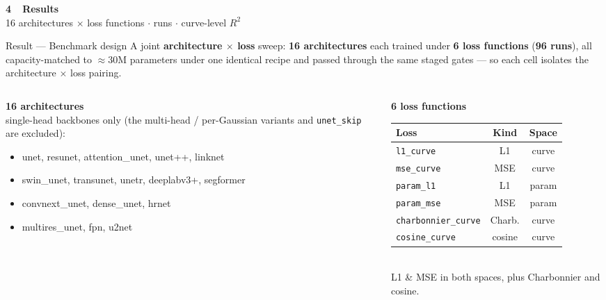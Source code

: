 \documentclass[aspectratio=169,10pt]{beamer}
\begin{document}
\begin{frame}[plain]
  \centering \vfill
  {\Large\bfseries\color{accent} 4\ \ Results}\\[4pt]
  {\small 16 architectures \; $\times$  loss functions \; $\cdot$  runs \; $\cdot$ \; curve-level $R^2$}
  \vfill
\end{frame}

\begin{frame}{Result --- Benchmark design}
  \small
  A joint \textbf{architecture $\times$ loss} sweep: \textbf{16 architectures} each trained
  under \textbf{6 loss functions} (\textbf{96 runs}), all capacity-matched to $\approx\!30$M
  parameters under one identical recipe and passed through the same staged gates --- so each
  cell isolates the architecture $\times$ loss pairing.
  \begin{columns}[T]
    \begin{column}{0.55\textwidth}
      \textbf{\scriptsize 16 architectures}\\[1pt]
      {\scriptsize single-head backbones only (the multi-head / per-Gaussian variants and
      \texttt{unet\_skip} are excluded):}
      \begin{itemize}\scriptsize
        \item unet, resunet, attention\_unet, unet++, linknet
        \item swin\_unet, transunet, unetr, deeplabv3+, segformer
        \item convnext\_unet, dense\_unet, hrnet
        \item multires\_unet, fpn, u2net
      \end{itemize}
    \end{column}
    \begin{column}{0.45\textwidth}
      \centering\scriptsize
      \textbf{6 loss functions}\\[2pt]
      \begin{tabular}{lcc}
        \toprule
        Loss & Kind & Space \\
        \midrule
        \texttt{l1\_curve}          & L1     & curve \\
        \texttt{mse\_curve}         & MSE    & curve \\
        \texttt{param\_l1}          & L1     & param \\
        \texttt{param\_mse}         & MSE    & param \\
        \texttt{charbonnier\_curve} & Charb. & curve \\
        \texttt{cosine\_curve}      & cosine & curve \\
        \bottomrule
      \end{tabular}
      \\[3pt]
      {\scriptsize L1 \& MSE in both spaces, plus Charbonnier and cosine.}
    \end{column}
  \end{columns}
\end{frame}
\end{document}
